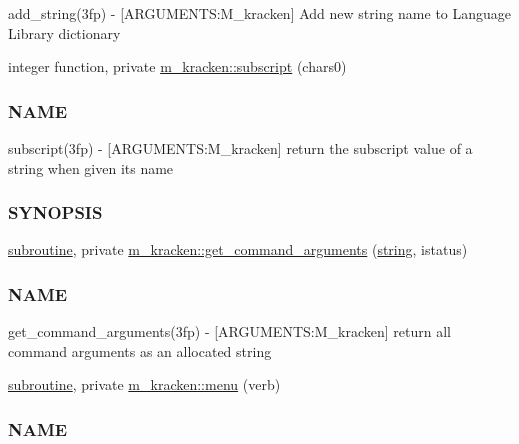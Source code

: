 \begin{DoxyCompactItemize}
\begin{DoxyCompactList}
add\+\_\+string(3fp) -\/ \mbox{[}A\+R\+G\+U\+M\+E\+N\+TS\+:M\+\_\+kracken\mbox{]} Add new string name to Language Library dictionary \end{DoxyCompactList}\item 
integer function, private \hyperlink{namespacem__kracken_a9e2129d174220802486cc2dc7e0cc443}{m\+\_\+kracken\+::subscript} (chars0)
\begin{DoxyCompactList}\small\item\em \subsubsection*{N\+A\+ME}

subscript(3fp) -\/ \mbox{[}A\+R\+G\+U\+M\+E\+N\+TS\+:M\+\_\+kracken\mbox{]} return the subscript value of a string when given it\textquotesingle{}s name \subsubsection*{S\+Y\+N\+O\+P\+S\+IS}\end{DoxyCompactList}\item 
\hyperlink{M__stopwatch_83_8txt_acfbcff50169d691ff02d4a123ed70482}{subroutine}, private \hyperlink{namespacem__kracken_a4c509f8594be3b73928c43c961c1caf4}{m\+\_\+kracken\+::get\+\_\+command\+\_\+arguments} (\hyperlink{what__overview_81_8txt_a74cb7e955273b9f9157b4f0c18a38849}{string}, istatus)
\begin{DoxyCompactList}\small\item\em \subsubsection*{N\+A\+ME}

get\+\_\+command\+\_\+arguments(3fp) -\/ \mbox{[}A\+R\+G\+U\+M\+E\+N\+TS\+:M\+\_\+kracken\mbox{]} return all command arguments as an allocated string \end{DoxyCompactList}\item 
\hyperlink{M__stopwatch_83_8txt_acfbcff50169d691ff02d4a123ed70482}{subroutine}, private \hyperlink{namespacem__kracken_ad0cfac1dcc02e0a67841f546cb57f823}{m\+\_\+kracken\+::menu} (verb)
\begin{DoxyCompactList}\small\item\em \subsubsection*{N\+A\+ME}


\end{DoxyCompactList}
\end{DoxyCompactItemize}
